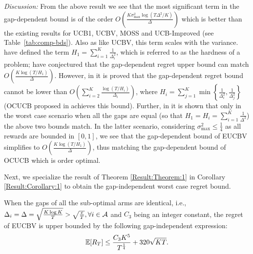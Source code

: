 \emph{Discussion:} From the above result we see that the most significant term in the gap-dependent bound is of the order $O\left(\frac{K\sigma^2_{\max}\log{(T\Delta^{2}/K)}}{\Delta}\right)$ which is better than the existing results for UCB1, UCBV, MOSS and UCB-Improved (see Table~\ref{tab:comp-bds}). Also as like UCBV, this term scales with the variance. \citet{audibert2010best} have defined the term $H_1=\sum_{i=1}^{K}\frac{1}{\Delta_i^2}$, which is referred to as the hardness of a problem; \citet{bubeck2012regret} have conjectured that the gap-dependent regret upper bound can match $O\left(\frac{K\log{(T/H_1)}}{\Delta}\right)$. However, in  \citet{lattimore2015optimally} it is proved that the gap-dependent regret bound cannot be lower than $O\left(\sum_{i=2}^{K}\frac{\log\left(T/H_i\right)}{\Delta_i}\right)$, where $H_i=\sum_{j=1}^{K}\min\left\lbrace \frac{1}{\Delta_i^2},\frac{1}{\Delta_j^2}\right\rbrace$ (OCUCB proposed in \citet{lattimore2015optimally} achieves this bound). Further, in \citet{lattimore2015optimally} it is shown that only in the worst case scenario when all the gaps are equal (so that $H_1=H_{i}=\sum_{i=1}^{K}\frac{1}{\Delta^2}$) the above two bounds match. In the latter scenario, considering $\sigma^2_{\max}\leq \frac{1}{4}$ as all rewards are bounded in $[0,1]$, we see that the gap-dependent bound of EUCBV simplifies to $O\left(\frac{K\log{(T/H_1)}}{\Delta}\right)$, thus matching the gap-dependent bound of OCUCB which is order optimal.

Next, we specialize the result of Theorem \ref{Result:Theorem:1} in Corollary \ref{Result:Corollary:1} to  obtain the gap-independent worst case regret bound. %



\begin{corollary}
\label{Result:Corollary:1}
When the gaps of all the sub-optimal arms are identical, i.e., $\Delta_i =\Delta = \sqrt{\frac{K\log K}{T}}>\sqrt{\frac{e}{T}}, \forall i\in \mathcal{A}$ and $C_3$ being an integer constant, the
regret of EUCBV is upper bounded by the following gap-independent expression:
\begin{align*}
	\mathbb{E}[R_{T}]\leq  \dfrac{C_3 K^5}{T^{\frac{1}{4}}} + 320\sqrt{KT}.
\end{align*}	
\end{corollary}
	
